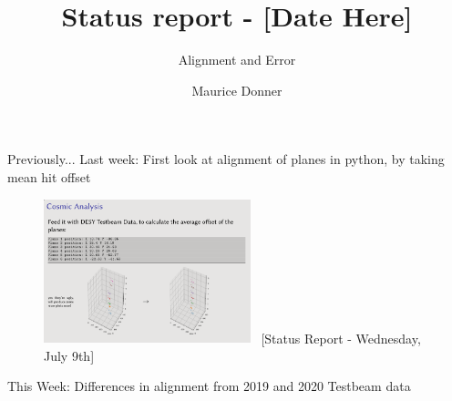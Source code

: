 \documentclass{beamer}
\title{\texorpdfstring{\color{blue!50!black}\textbf{Status report - [Date Here] }}{}}
\subtitle{Alignment and Error}
\author{Maurice Donner}
\date{}
\begin{document}
\maketitle

\begin{frame}{Previously...}
Last week: First look at alignment of planes in python, by taking mean hit offset\\
\begin{figure}[H]
    \centering
    \includegraphics[width=6cm]{Last_Week.png}
    \tiny \ [Status Report - Wednesday, July 9th]
\end{figure}
\pause
This Week: Differences in alignment from 2019 and 2020 Testbeam data
\end{frame}
\end{document}
